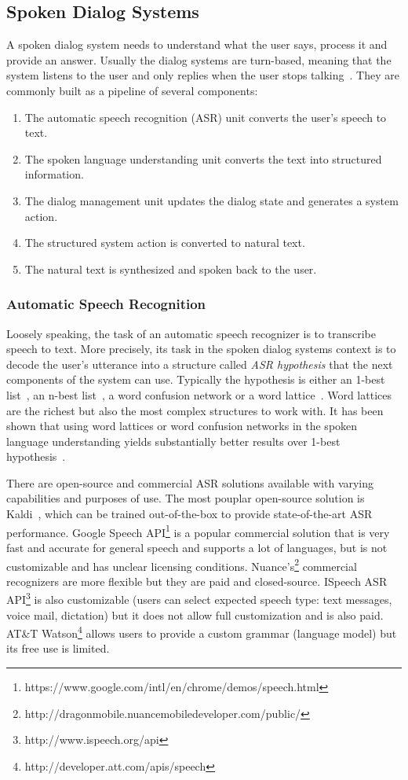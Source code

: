 \documentclass[10pt,twocolumn]{article}
\begin{document}
\subsection{Spoken Dialog Systems}
\label{sec:spoken_dialog_systems}
A spoken dialog system needs to understand what the user says, process it and provide an answer. Usually the dialog systems are turn-based, meaning that the system listens to the user and only replies when the user stops talking~\cite{thomson2010bayesian}. They are commonly built as a pipeline of several components:
\begin{enumerate}
  \item The automatic speech recognition (ASR) unit converts the user's speech to text.
  \item The spoken language understanding unit converts the text into structured information.
  \item The dialog management unit updates the dialog state and generates a system action.
  \item The structured system action is converted to natural text.
  \item The natural text is synthesized and spoken back to the user.
\end{enumerate}

\subsubsection{Automatic Speech Recognition}
Loosely speaking, the task of an automatic speech recognizer is to transcribe speech to text. More precisely, its task in the spoken dialog systems context is to decode the user's utterance into a structure called \emph{ASR hypothesis} that the next components of the system can use. Typically the hypothesis is either an 1-best list~\cite{gorin1997may,wang2003word}, an n-best list~\cite{he2003data}, a word confusion network\cite{hakkani2006beyond} or a word lattice~\cite{oerder1993word}. Word lattices are the richest but also the most complex structures to work with. It has been shown that using word lattices or word confusion networks in the spoken language understanding yields substantially better results over 1-best hypothesis~\cite{tur2002improving}.

There are open-source and commercial ASR solutions available with varying capabilities and purposes of use. The most pouplar open-source solution is Kaldi~\cite{povey2011kaldi}, which can be trained out-of-the-box to provide state-of-the-art ASR performance. Google Speech API\footnote{https://www.google.com/intl/en/chrome/demos/speech.html} is a popular commercial solution that is very fast and accurate for general speech and supports a lot of languages, but is not customizable and has unclear licensing conditions. Nuance's\footnote{http://dragonmobile.nuancemobiledeveloper.com/public/} commercial recognizers are more flexible but they are paid and closed-source. ISpeech ASR API\footnote{http://www.ispeech.org/api} is also customizable (users can select expected speech type: text messages, voice mail, dictation) but it does not allow full customization and is also paid. AT\&T Watson\footnote{http://developer.att.com/apis/speech} allows users to provide a custom grammar (language model) but
its free use is limited.
\end{document}
